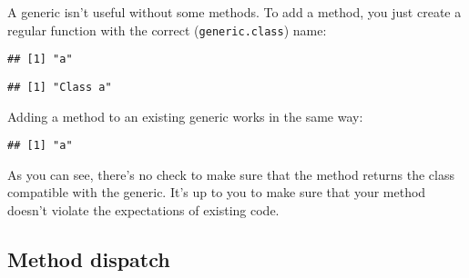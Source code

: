 A generic isn't useful without some methods. To add a method, you just
create a regular function with the correct (\texttt{generic.class})
name: 

\begin{Shaded}
\begin{Highlighting}[]
\StringTok{ }

\StringTok{ }\NormalTok{(}\NormalTok{(), } \NormalTok{)}
\end{Highlighting}
\end{Shaded}

\begin{verbatim}
## [1] "a"
\end{verbatim}

\begin{Shaded}
\begin{Highlighting}[]
\end{Highlighting}
\end{Shaded}

\begin{verbatim}
## [1] "Class a"
\end{verbatim}

Adding a method to an existing generic works in the same way:

\begin{Shaded}
\begin{Highlighting}[]
\StringTok{ }
\end{Highlighting}
\end{Shaded}

\begin{verbatim}
## [1] "a"
\end{verbatim}

As you can see, there's no check to make sure that the method returns
the class compatible with the generic. It's up to you to make sure that
your method doesn't violate the expectations of existing code.

\hypertarget{method-dispatch}{%
\subsection{Method dispatch}\label{method-dispatch}}


